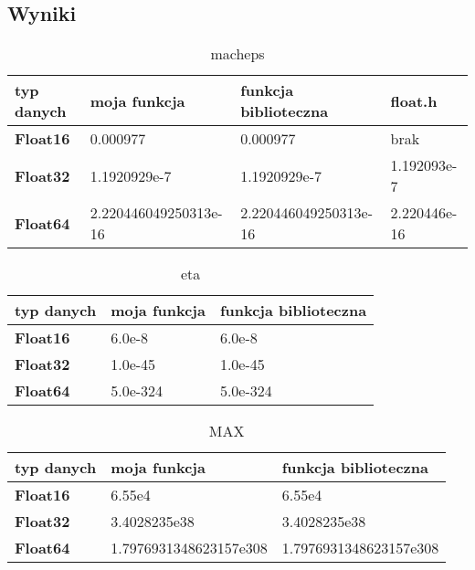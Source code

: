 \documentclass[12pt]{article}
\begin{document}
\subsection{Wyniki}
    \begin{table}[h]
        \caption{macheps}
        \label{epsilon}
        \begin{tabular}{|l|l|l|l|}
            \hline 
            \textbf{typ danych} & \textbf{moja funkcja} & \textbf{funkcja biblioteczna} & \textbf{float.h}\\
            \hline
            \textbf{Float16} & 0.000977 & 0.000977 & brak\\
            \hline
            \textbf{Float32} & 1.1920929e-7 & 1.1920929e-7 & 1.192093e-7\\
            \hline
            \textbf{Float64} & 2.220446049250313e-16 & 2.220446049250313e-16 & 2.220446e-16\\
            \hline
        \end{tabular} 
    \end{table}
    \begin{table}[h]
        \caption{eta}
        \label{eta}
        \begin{tabular}{|l|l|l|}
            \hline 
            \textbf{typ danych} & \textbf{moja funkcja} & \textbf{funkcja biblioteczna}\\
            \hline
            \textbf{Float16} & 6.0e-8 & 6.0e-8\\
            \hline
            \textbf{Float32} & 1.0e-45 & 1.0e-45\\
            \hline
            \textbf{Float64} & 5.0e-324 & 5.0e-324 \\
            \hline
        \end{tabular} 
    \end{table}

    \begin{table}[h]
        \caption{MAX}
        \label{max}
        \begin{tabular}{|l|l|l|}
            \hline 
            \textbf{typ danych} & \textbf{moja funkcja} & \textbf{funkcja biblioteczna}\\
            \hline
            \textbf{Float16} & 6.55e4 & 6.55e4\\
            \hline
            \textbf{Float32} & 3.4028235e38 & 3.4028235e38\\
            \hline
            \textbf{Float64} & 1.7976931348623157e308 & 1.7976931348623157e308 \\
            \hline
        \end{tabular} 
    \end{table}
\end{document}
